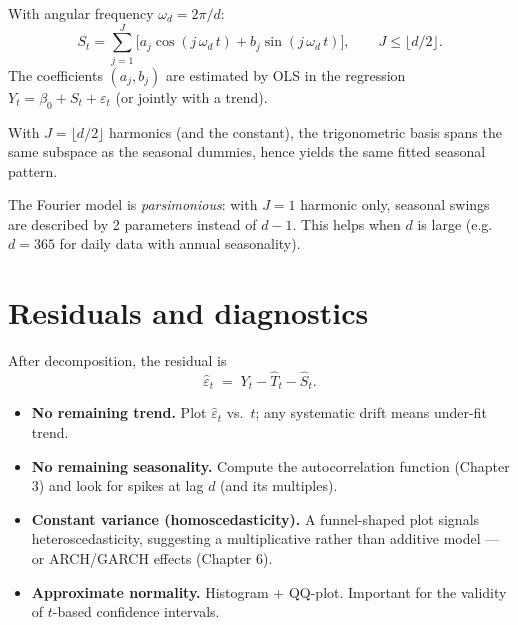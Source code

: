 \begin{defbox}
\label{def:fourier}
With angular frequency $\omega_d = 2\pi / d$:
\[
  S_t = \sum_{j=1}^{J}\bigl[a_j \cos(j\,\omega_d\, t) + b_j \sin(j\,\omega_d\, t)\bigr],
  \qquad J \leq \lfloor d / 2 \rfloor.
\]
The coefficients $(a_j, b_j)$ are estimated by OLS in the regression
$Y_t = \beta_0 + S_t + \varepsilon_t$ (or jointly with a trend).
\end{defbox}

\begin{propbox}
\label{prop:fourier-equiv}
With $J = \lfloor d/2 \rfloor$ harmonics (and the constant), the
trigonometric basis spans the same subspace as the seasonal dummies,
hence yields the same fitted seasonal pattern.
\end{propbox}

\begin{rembox}
The Fourier model is \emph{parsimonious}: with $J = 1$ harmonic only,
seasonal swings are described by 2 parameters instead of $d - 1$. This
helps when $d$ is large (e.g.\ $d = 365$ for daily data with annual
seasonality).
\end{rembox}

\section{Residuals and diagnostics}
\label{sec:residuals}

After decomposition, the residual is
\[
  \widehat{\varepsilon}_t \;=\; Y_t - \widehat{T}_t - \widehat{S}_t.
\]

\begin{rembox}
\begin{itemize}
  \item \textbf{No remaining trend.} Plot $\widehat{\varepsilon}_t$ vs.\ $t$;
        any systematic drift means under-fit trend.
  \item \textbf{No remaining seasonality.} Compute the autocorrelation
        function (Chapter 3) and look for spikes at lag $d$ (and its
        multiples).
  \item \textbf{Constant variance (homoscedasticity).} A funnel-shaped
        plot signals heteroscedasticity, suggesting a multiplicative
        rather than additive model — or ARCH/GARCH effects (Chapter 6).
  \item \textbf{Approximate normality.} Histogram + QQ-plot. Important
        for the validity of $t$-based confidence intervals.
\end{itemize}
\end{rembox}

